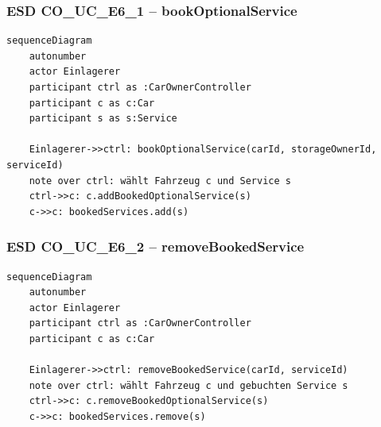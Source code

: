 \newpage

{}
\subsubsection*{ESD CO\_UC\_E6\_1 – bookOptionalService}

\begin{lstlisting}[basicstyle=\ttfamily\small, breaklines=true]
sequenceDiagram
    autonumber
    actor Einlagerer
    participant ctrl as :CarOwnerController
    participant c as c:Car
    participant s as s:Service

    Einlagerer->>ctrl: bookOptionalService(carId, storageOwnerId, serviceId)
    note over ctrl: wählt Fahrzeug c und Service s
    ctrl->>c: c.addBookedOptionalService(s)
    c->>c: bookedServices.add(s)
\end{lstlisting}

\newpage

{}
\subsubsection*{ESD CO\_UC\_E6\_2 – removeBookedService}

\begin{lstlisting}[basicstyle=\ttfamily\small, breaklines=true]
sequenceDiagram
    autonumber
    actor Einlagerer
    participant ctrl as :CarOwnerController
    participant c as c:Car

    Einlagerer->>ctrl: removeBookedService(carId, serviceId)
    note over ctrl: wählt Fahrzeug c und gebuchten Service s
    ctrl->>c: c.removeBookedOptionalService(s)
    c->>c: bookedServices.remove(s)
\end{lstlisting}

\newpage

{}
